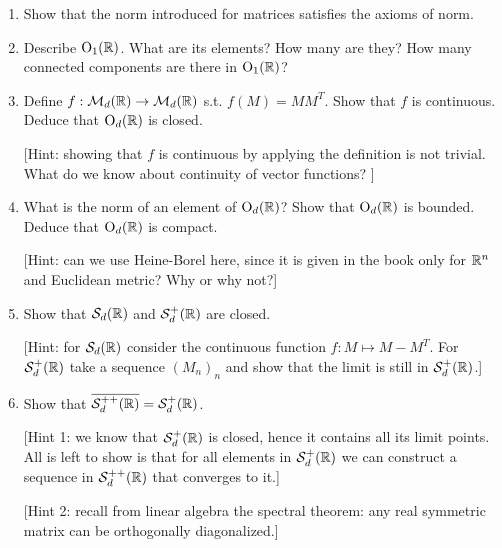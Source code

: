 \documentclass[12pt,a4paper]{article}
\newcommand{\Tailperso}[1]{%
\vfill	
\vskip2ex\noindent
\hrule
\vskip2ex\noindent
{\small
Informations générales, séries, voir \url{https://moodle.unige.ch/course/view.php?id=5641}}
\vskip2ex\noindent
\vskip2ex
}
\begin{document}
\begin{enumerate}
\item Show that the norm introduced for matrices satisfies the axioms of norm.
\item Describe $\operatorname{O}_1(\mathbb{R})$. What are its elements? How many are they? How many connected components are there in $\operatorname{O}_1(\mathbb{R})$?
\item Define $f:\mathcal{M}_d(\mathbb{R})\to \mathcal{M}_d(\mathbb{R})$ s.t. $f(M)=MM^T$. Show that $f$ is continuous. Deduce that $\operatorname{O}_d(\mathbb{R})$ is closed.

[Hint: showing that $f$ is continuous by applying the definition is not trivial. What do we know about continuity of vector functions? ]
\item What is the norm of an element of $\operatorname{O}_d(\mathbb{R})$? Show that $\operatorname{O}_d(\mathbb{R})$ is bounded. Deduce that $\operatorname{O}_d(\mathbb{R})$ is compact.

[Hint: can we use Heine-Borel here, since it is given in the book only for $\mathbb{R}^n$ and Euclidean metric? Why or why not?]
\item Show that $\mathcal{S}_d(\mathbb{R})$ and $\mathcal{S}_d^+(\mathbb{R})$ are closed. 

[Hint: for $\mathcal{S}_d(\mathbb{R})$ consider the continuous function $f\colon M\mapsto M-M^T$. For $\mathcal{S}_d^+(\mathbb{R})$ take a sequence $(M_n)_n$ and show that the limit is still in $\mathcal{S}_d^+(\mathbb{R})$.]
\item Show that $\overline{\mathcal{S}_d^{++}(\mathbb{R})}=\mathcal{S}_d^+(\mathbb{R})$.

[Hint 1: we know that $\mathcal{S}_d^+(\mathbb{R})$ is closed, hence it contains all its limit points. All is left to show is that for all elements in $\mathcal{S}_d^+(\mathbb{R})$ we can construct a sequence in $\mathcal{S}_d^{++}(\mathbb{R})$ that converges to it.]

[Hint 2: recall from linear algebra the spectral theorem: any real symmetric matrix can be orthogonally diagonalized.]
\end{enumerate}




\solution{

}






 
\end{document}
